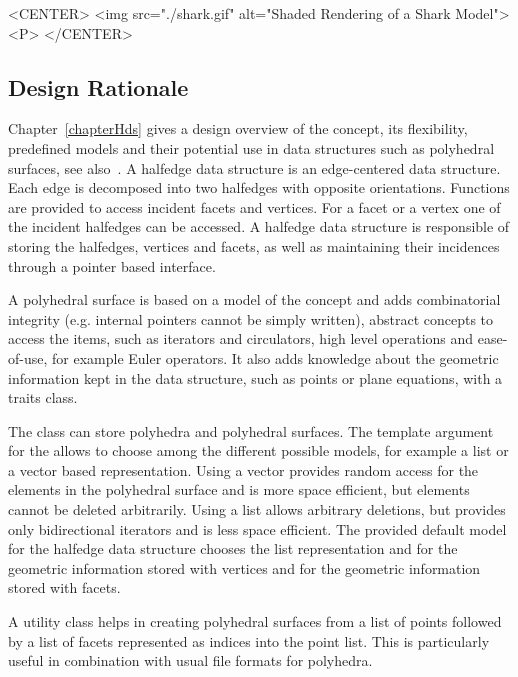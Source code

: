 \begin{ccHtmlOnly}
    <CENTER>
        <img src="./shark.gif" alt="Shaded Rendering of a Shark Model"><P>
    </CENTER>
\end{ccHtmlOnly}

\subsection*{Design Rationale}

Chapter~\ref{chapterHds} gives a design overview of the
 concept, its flexibility, predefined
models and their potential use in data structures such as polyhedral
surfaces, see also~\cite{k-ddsps-98}. A halfedge data structure is an
edge-centered data structure. Each edge is decomposed into two
halfedges with opposite orientations. Functions are provided to access
incident facets and vertices. For a facet or a vertex one of the
incident halfedges can be accessed. A halfedge data structure is
responsible of storing the halfedges, vertices and facets, as well as
maintaining their incidences through a pointer based interface.

A polyhedral surface is based on a model of the
 concept and adds combinatorial integrity
(e.g. internal pointers cannot be simply written), abstract concepts
to access the items, such as iterators and circulators, high level
operations and ease-of-use, for example Euler operators. It also adds
knowledge about the geometric information kept in the data structure,
such as points or plane equations, with a traits class.

The class  can store polyhedra and polyhedral
surfaces. The template argument for the 
allows to choose among the different possible models, for example a
list or a vector based representation.  Using a vector provides random
access for the elements in the polyhedral surface and is more space
efficient, but elements cannot be deleted arbitrarily. Using a list
allows arbitrary deletions, but provides only bidirectional iterators
and is less space efficient. The provided default model for the
halfedge data structure
 chooses the
list representation and  for the geometric
information stored with vertices and  for the
geometric information stored with facets.

A utility class  helps in
creating polyhedral surfaces from a list of points followed by a list
of facets represented as indices into the point list. This is
particularly useful in combination with usual file formats for polyhedra.

